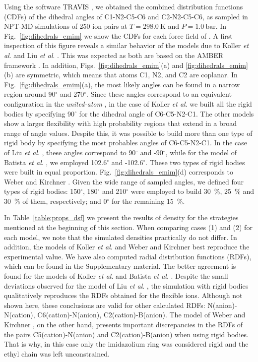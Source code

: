 \documentclass[3p,twocolumn]{elsarticle}
\begin{document}
Using the software TRAVIS \cite{Brehm_2011}, we obtained the combined distribution functions (CDFs) of the dihedral angles of C1-N2-C5-C6 and C2-N2-C5-C6, as sampled in NPT-MD simulations of 250 ion pairs at $T = 298.0~\text{K}$ and $P = 1.0~\text{bar}$.
In Fig.~\ref{fig:dihedrals_emim} we show the CDFs for each force field of \ce{[emim][B(CN)_4]}.
A first inspection of this figure reveals a similar behavior of the models due to Koller \textit{et al}. \cite{Koller_2012} and Liu \textit{et al}. \cite{Liu_2014}.
This was expected as both are based on the AMBER framework \cite{Cornell_1995}.
In addition, Figs.~\ref{fig:dihedrals_emim}(a) and \ref{fig:dihedrals_emim}(b) are symmetric, which means that atoms C1, N2, and C2 are coplanar.
In Fig.~\ref{fig:dihedrals_emim}(a), the most likely angles can be found in a narrow region around 90$^{\circ}$ and 270$^{\circ}$.
Since these angles correspond to an equivalent configuration in the \textit{united-atom} \ce{[emim]^+}, in the case of Koller \textit{et al}. \cite{Koller_2012} we built all the rigid bodies by specifying 90$^{\circ}$ for the dihedral angle of C6-C5-N2-C1.
The other models show a larger flexibility with high probability regions that extend in a broad range of angle values.
Despite this, it was possible to build more than one type of rigid body by specifying the most probables angles of C6-C5-N2-C1.
In the case of Liu \textit{et al}. \cite{Liu_2014}, these angles correspond to 90$^{\circ}$ and -90$^{\circ}$, while for the model of Batista \textit{et al}. \cite{Batista_2015}, we employed 102.6$^{\circ}$ and -102.6$^{\circ}$.
These two types of rigid bodies were built in equal proportion.
Fig.~\ref{fig:dihedrals_emim}(d) corresponds to Weber and Kirchner \cite{Weber_2016}. 
Given the wide range of sampled angles, we defined four types of rigid bodies: 150$^{\circ}$, 180$^{\circ}$ and 210$^{\circ}$ were employed to build 30~\%, 25~\% and 30~\% of them, respectively; and 0$^{\circ}$ for the remaining 15~\%.

In Table~\ref{table:props_dsf} we present the results of density for the strategies mentioned at the beginning of this section.
When comparing cases (1) and (2) for each model, we note that the simulated densities practically do not differ.
In addition, the models of Koller \textit{et al}. \cite{Koller_2012} and Weber and Kirchner \cite{Weber_2016} best reproduce the experimental value.
We have also computed radial distribution functions (RDFs), which can be found in the Supplementary material.
The better agreement is found for the models of Koller \textit{et al}. \cite{Koller_2012} and Batista \textit{et al}. \cite{Batista_2015}.
Despite the small deviations observed for the model of Liu \textit{et al}. \cite{Liu_2014}, the simulation with rigid bodies qualitatively reproduces the RDFs obtained for the flexible ions.
Although not shown here, these conclusions are valid for other calculated RDFs: N(anion)-N(cation), C6(cation)-N(anion), C2(cation)-B(anion).
The model of Weber and Kirchner \cite{Weber_2016}, on the other hand, presents important discrepancies in the RDFs of the pairs C5(cation)-N(anion) and C2(cation)-B(anion) when using rigid bodies.
That is why, in this case only the imidazolium ring was considered rigid and the ethyl chain was left unconstrained. 
\end{document}
